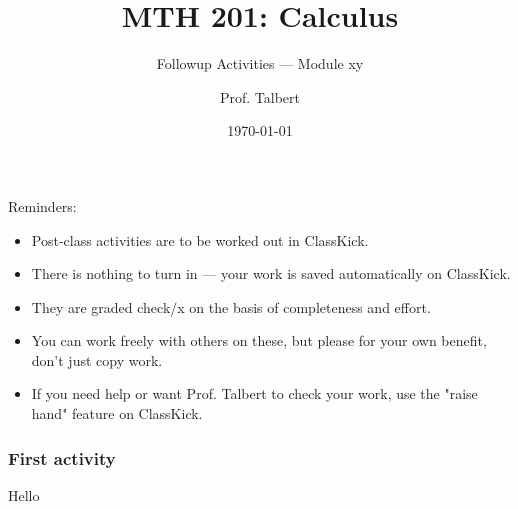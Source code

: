 \documentclass{beamer}
\title{MTH 201: Calculus}
\subtitle{Followup Activities --- Module xy}
\author{Prof. Talbert}
\institute{GVSU}
\date{\today}
\begin{document}
\frame{\titlepage}

\begin{frame}{Reminders:}

    \begin{itemize}
        \item Post-class activities are to be worked out in ClassKick.
        \item There is nothing to turn in --- your work is saved automatically on ClassKick. 
        \item They are graded check/x on the basis of completeness and effort. 
        \item You can work freely with others on these, but please for your own benefit, don't just copy work. 
        \item If you need help or want Prof. Talbert to check your work, use the "raise hand" feature on ClassKick. 
    \end{itemize}
    
    \end{frame}


\begin{frame}[t]
    \frametitle{First activity}

    Hello

\end{frame}
\end{document}
